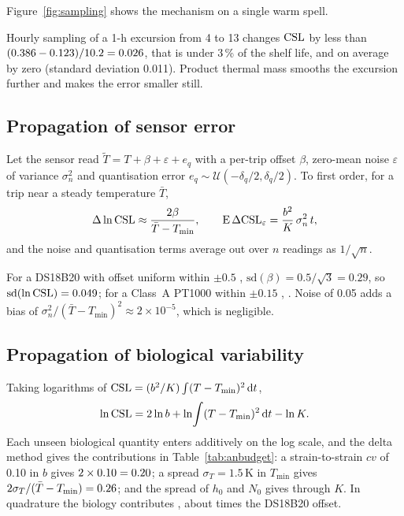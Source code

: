 Figure~\ref{fig:sampling} shows the mechanism on a single warm spell.

\begin{worked}
Hourly sampling of a 1-h excursion from 4 to 13\degC{} changes $\mathrm{CSL}$ by less than $(0.386-0.123)/10.2=0.026$, that is under 3\,\% of the shelf life, and on average by zero (standard deviation 0.011). Product thermal mass smooths the excursion further and makes the error smaller still.
\end{worked}


\subsection{Propagation of sensor error}
\begin{proposition}\label{prop:sensor}
Let the sensor read $\tilde T=T+\beta+\varepsilon+e_q$ with a per-trip offset $\beta$, zero-mean noise $\varepsilon$ of variance $\sigma_n^2$ and quantisation error $e_q\sim\mathcal U(-\delta_q/2,\delta_q/2)$. To first order, for a trip near a steady temperature $\bar T$,
\begin{equation}\label{eq:sensor}
\Delta\ln\mathrm{CSL}\approx\frac{2\beta}{\bar T-T_{\min}},\qquad \mathrm{E}\,\Delta\mathrm{CSL}_{\varepsilon}=\frac{b^2}{K}\,\sigma_n^2\,t,
\end{equation}
and the noise and quantisation terms average out over $n$ readings as $1/\sqrt n$.
\end{proposition}
For a DS18B20 with offset uniform within $\pm0.5$\degC{} \cite{ds18b20}, $\mathrm{sd}(\beta)=0.5/\sqrt3=0.29$\degC, so $\mathrm{sd}(\ln\mathrm{CSL})=0.049$; for a Class~A PT1000 within $\pm0.15$\degC{} \cite{iec60751}, \AnSdPT. Noise of 0.05\degC{} adds a bias of $\sigma_n^2/(\bar T-T_{\min})^2\approx2\times10^{-5}$, which is negligible.

\subsection{Propagation of biological variability}
Taking logarithms of $\mathrm{CSL}=(b^2/K)\int(T-T_{\min})^2\,\mathrm{d} t$,
\begin{equation}\label{eq:lncsl}
\ln\mathrm{CSL}=2\ln b+\ln\!\int(T-T_{\min})^2\,\mathrm{d} t-\ln K .
\end{equation}
Each unseen biological quantity enters additively on the log scale, and the delta method gives the contributions in Table~\ref{tab:anbudget}: a strain-to-strain $cv$ of 0.10 in $b$ gives $2\times0.10=0.20$; a spread $\sigma_T=1.5$\,K in $T_{\min}$ gives $2\sigma_T/(\bar T-T_{\min})=0.26$; and the spread of $h_0$ and $N_0$ gives \AnSdK{} through $K$. In quadrature the biology contributes \AnSdBio, about \AnRatio{} times the DS18B20 offset.

